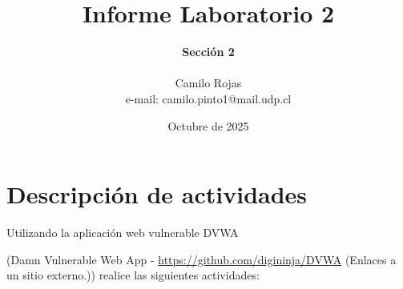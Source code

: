 \documentclass[letterpaper,12pt]{article}
\begin{document}
%
   \title{\Huge{Informe Laboratorio 2}}

   \author{\textbf{Sección 2} \\  \\Camilo Rojas \\ e-mail: camilo.pinto1@mail.udp.cl}
          
   \date{Octubre de 2025}

   \maketitle
   
   \tableofcontents
 
  \newpage
  

\section{Descripción de actividades}
Utilizando la aplicación web vulnerable DVWA

(Damn Vulnerable Web App - \href{https://github.com/digininja/DVWA}{https://github.com/digininja/DVWA} (Enlaces a un sitio externo.)) realice las siguientes actividades:
\end{document}
